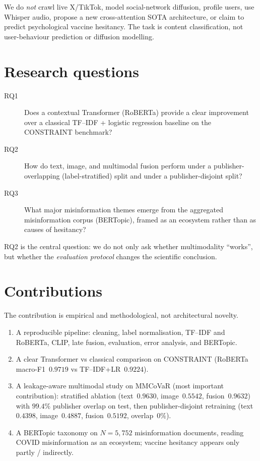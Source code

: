 \documentclass[12pt, a4paper]{report}
\begin{document}
We do \emph{not} crawl live X/TikTok, model social-network diffusion, profile users, use Whisper audio, propose a new cross-attention SOTA architecture, or claim to predict psychological vaccine hesitancy.
The task is content classification, not user-behaviour prediction or diffusion modelling.

\section{Research questions}
\label{sec:rqs}

\begin{description}
  \item[RQ1] Does a contextual Transformer (RoBERTa) provide a clear improvement over a classical TF--IDF + logistic regression baseline on the CONSTRAINT benchmark?
  \item[RQ2] How do text, image, and multimodal fusion perform under a publisher-overlapping (label-stratified) split and under a publisher-disjoint split?
  \item[RQ3] What major misinformation themes emerge from the aggregated misinformation corpus (BERTopic), framed as an ecosystem rather than as causes of hesitancy?
\end{description}

RQ2 is the central question: we do not only ask whether multimodality ``works'', but whether the \emph{evaluation protocol} changes the scientific conclusion.

\section{Contributions}
\label{sec:contribution}

The contribution is empirical and methodological, not architectural novelty.

\begin{enumerate}
  \item A reproducible pipeline: cleaning, label normalisation, TF--IDF and RoBERTa, CLIP, late fusion, evaluation, error analysis, and BERTopic.
  \item A clear Transformer vs classical comparison on CONSTRAINT (RoBERTa macro-F1~$0.9719$ vs TF--IDF+LR~$0.9224$).
  \item A leakage-aware multimodal study on MMCoVaR (most important contribution): stratified ablation (text~$0.9630$, image~$0.5542$, fusion~$0.9632$) with $99.4\%$ publisher overlap on test, then publisher-disjoint retraining (text~$0.4398$, image~$0.4887$, fusion~$0.5192$, overlap~$0\%$).
  \item A BERTopic taxonomy on $N=5{,}752$ misinformation documents, reading COVID misinformation as an ecosystem; vaccine hesitancy appears only partly / indirectly.
\end{enumerate}
\end{document}
